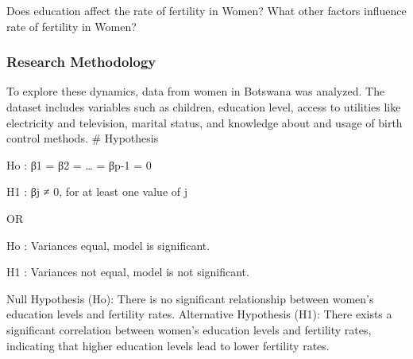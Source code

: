 \documentclass[
  letterpaper,
  DIV=11,
  numbers=noendperiod]{scrartcl}
\begin{document}
\begin{tcolorbox}[enhanced jigsaw, leftrule=.75mm, breakable, opacityback=0, left=2mm, colback=white, bottomtitle=1mm, toptitle=1mm, arc=.35mm, colbacktitle=quarto-callout-tip-color!10!white, colframe=quarto-callout-tip-color-frame, rightrule=.15mm, opacitybacktitle=0.6, titlerule=0mm, title=\textcolor{quarto-callout-tip-color}{\faLightbulb}\hspace{0.5em}{Research Question}, coltitle=black, bottomrule=.15mm, toprule=.15mm]

Does education affect the rate of fertility in Women? What other factors
influence rate of fertility in Women?

\end{tcolorbox}

\hypertarget{research-methodology}{%
\subsubsection{Research Methodology}\label{research-methodology}}

To explore these dynamics, data from women in Botswana was analyzed. The
dataset includes variables such as children, education level, access to
utilities like electricity and television, marital status, and knowledge
about and usage of birth control methods. \# Hypothesis

\begin{tcolorbox}[enhanced jigsaw, leftrule=.75mm, breakable, opacityback=0, left=2mm, colback=white, bottomtitle=1mm, toptitle=1mm, arc=.35mm, colbacktitle=quarto-callout-note-color!10!white, colframe=quarto-callout-note-color-frame, rightrule=.15mm, opacitybacktitle=0.6, titlerule=0mm, title=\textcolor{quarto-callout-note-color}{\faInfo}\hspace{0.5em}{Note}, coltitle=black, bottomrule=.15mm, toprule=.15mm]

Ho : β1 = β2 = \ldots{} = βp-1 = 0

H1 : βj ≠ 0, for at least one value of j

OR

Ho : Variances equal, model is significant.

H1 : Variances not equal, model is not significant.

\end{tcolorbox}

Null Hypothesis (Ho): There is no significant relationship between
women's education levels and fertility rates. Alternative Hypothesis
(H1): There exists a significant correlation between women's education
levels and fertility rates, indicating that higher education levels lead
to lower fertility rates.
\end{document}
